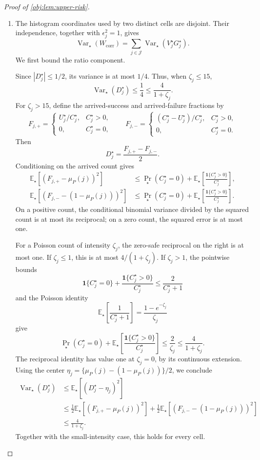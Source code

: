 \documentclass[11pt]{article}
\begin{document}
\begin{proof}[Proof of \cref{obj:lem:upper-risk}]
\begin{enumerate}
\item The histogram coordinates used by two distinct cells are disjoint. Their independence, together with \(\epsilon_j^2=1\), gives
\[
\operatorname{Var}_\star(W_{\mathrm{corr}})
=\sum_{j\in\mathcal J}
\operatorname{Var}_\star(V_j^\star G_j^\star).
\]
We first bound the ratio component.

Since \(|D_j^\star|\le1/2\), its variance is at most \(1/4\). Thus, when \(\zeta_j\le15\),
\[
\operatorname{Var}_\star(D_j^\star)
\le\frac14\le\frac4{1+\zeta_j}.
\]
For \(\zeta_j>15\), define the arrived-success and arrived-failure fractions by
\[
F_{j,+}=
\begin{cases}
U_j^\star/C_j^\star,&C_j^\star>0,\\
0,&C_j^\star=0,
\end{cases}
\qquad
F_{j,-}=
\begin{cases}
(C_j^\star-U_j^\star)/C_j^\star,&C_j^\star>0,\\
0,&C_j^\star=0.
\end{cases}
\]
Then
\[
D_j^\star=\frac{F_{j,+}-F_{j,-}}2.
\]
Conditioning on the arrived count gives
\[
\begin{aligned}
\mathbb E_\star[(F_{j,+}-\mu_P(j))^2]
&\le
\Pr_\star(C_j^\star=0)
+\mathbb E_\star\!\left[
\frac{\mathbf1\{C_j^\star>0\}}{C_j^\star}\right],\\
\mathbb E_\star[(F_{j,-}-(1-\mu_P(j)))^2]
&\le
\Pr_\star(C_j^\star=0)
+\mathbb E_\star\!\left[
\frac{\mathbf1\{C_j^\star>0\}}{C_j^\star}\right].
\end{aligned}
\]
On a positive count, the conditional binomial variance divided by the squared count is at most its reciprocal; on a zero count, the squared error is at most one.

For a Poisson count of intensity \(\zeta_j\), the zero-safe reciprocal on the right is at most one. If \(\zeta_j\le1\), this is at most \(4/(1+\zeta_j)\). If \(\zeta_j>1\), the pointwise bounds
\[
\mathbf1\{C_j^\star=0\}
+\frac{\mathbf1\{C_j^\star>0\}}{C_j^\star}
\le\frac2{C_j^\star+1}
\]
and the Poisson identity
\[
\mathbb E_\star\!\left[\frac1{C_j^\star+1}\right]
=\frac{1-e^{-\zeta_j}}{\zeta_j}
\]
give
\[
\Pr_\star(C_j^\star=0)
+\mathbb E_\star\!\left[
\frac{\mathbf1\{C_j^\star>0\}}{C_j^\star}\right]
\le\frac2{\zeta_j}
\le\frac4{1+\zeta_j}.
\]
The reciprocal identity has value one at \(\zeta_j=0\), by its continuous extension. Using the center
\(\eta_j=\{\mu_P(j)-(1-\mu_P(j))\}/2\), we conclude
\[
\begin{aligned}
\operatorname{Var}_\star(D_j^\star)
&\le\mathbb E_\star[(D_j^\star-\eta_j)^2]\\
&\le\frac12\mathbb E_\star[(F_{j,+}-\mu_P(j))^2]
+\frac12\mathbb E_\star[(F_{j,-}-(1-\mu_P(j)))^2]\\
&\le\frac4{1+\zeta_j}.
\end{aligned}
\]
Together with the small-intensity case, this holds for every cell.


\end{enumerate}
\end{proof}
\end{document}
